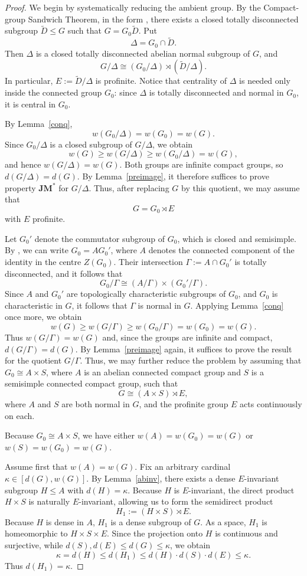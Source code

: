 \documentclass[12pt]{amsart}
\theoremstyle{definition}
\numberwithin{equation}{section}
\theoremstyle{remark}
\def\JM{\mathbf{JM}}
\begin{document}
\begin{proof}
We begin by systematically reducing the ambient group. By the Compact-group Sandwich Theorem, in the form \cite[Corollary~9.42]{HM}, there exists a closed totally disconnected subgroup $\widetilde D\leq G$ such that $G=G_0\widetilde D$. Put
\[
\Delta=G_0\cap\widetilde D.
\]
Then $\Delta$ is a closed totally disconnected abelian normal subgroup of $G$, and
\[
G/\Delta\cong (G_0/\Delta)\rtimes (\widetilde D/\Delta).
\]
In particular, $E:=\widetilde D/\Delta$ is profinite. Notice that centrality of $\Delta$ is needed only inside the connected group $G_0$: since $\Delta$ is totally disconnected and normal in $G_0$, it is central in $G_0$.

By Lemma~\ref{conq},
\[
w(G_0/\Delta)=w(G_0)=w(G).
\]
Since $G_0/\Delta$ is a closed subgroup of $G/\Delta$, we obtain
\[
w(G)\geq w(G/\Delta)\geq w(G_0/\Delta)=w(G),
\]
and hence $w(G/\Delta)=w(G)$. Both groups are infinite compact groups, so $d(G/\Delta)=d(G)$. By Lemma~\ref{preimage}, it therefore suffices to prove property $\JM^*$ for $G/\Delta$. Thus, after replacing $G$ by this quotient, we may assume that
\[
G=G_0\rtimes E
\]
with $E$ profinite.

Let $G_0'$ denote the commutator subgroup of $G_0$, which is closed and semisimple. 
By \cite[Theorem~9.24]{HM}, we can write $G_0 = A G_0'$, where $A$ denotes the connected component of the identity in the centre $Z(G_0)$. Their intersection $\Gamma := A \cap G_0'$ is totally disconnected, and it follows that
\[
G_0/\Gamma \cong (A/\Gamma) \times (G_0'/\Gamma).
\]
Since $A$ and $G_0'$ are topologically characteristic subgroups of $G_0$, and $G_0$ is characteristic in $G$, it follows that $\Gamma$ is normal in $G$. Applying Lemma~\ref{conq} once more, we obtain
\[
w(G)\geq w(G/\Gamma)\geq w(G_0/\Gamma)=w(G_0)=w(G).
\]
Thus $w(G/\Gamma)=w(G)$ and, since the groups are infinite and compact, $d(G/\Gamma)=d(G)$. By Lemma~\ref{preimage} again, it suffices to prove the result for the quotient $G/\Gamma$. 
Thus, we may further reduce the problem by assuming that $G_0 \cong A \times S$, where $A$ is an abelian connected compact group and $S$ is a semisimple connected compact group, such that
\[
G \cong (A \times S) \rtimes E,
\]
where $A$ and $S$ are both normal in $G$, and the profinite group $E$ acts continuously on each.

Because $G_0 \cong A \times S$, we have either $w(A) = w(G_0) = w(G)$ or $w(S) = w(G_0) = w(G)$. 

Assume first that $w(A) = w(G)$. 
Fix an arbitrary cardinal $\kappa \in [d(G), w(G)]$. 
By Lemma~\ref{abinv}, there exists a dense $E$-invariant subgroup $H \leq A$ with $d(H) = \kappa$. 
Because $H$ is $E$-invariant, the direct product $H \times S$ is naturally $E$-invariant, allowing us to form the semidirect product
\[
H_1 := (H \times S) \rtimes E.
\]
Because $H$ is dense in $A$, $H_1$ is a dense subgroup of $G$. As a space, $H_1$ is homeomorphic to $H\times S\times E$. Since the projection onto $H$ is continuous and surjective, while $d(S),d(E)\leq d(G)\leq\kappa$, we obtain
\[
\kappa=d(H)\leq d(H_1)\leq d(H)\cdot d(S)\cdot d(E)\leq\kappa.
\]
Thus $d(H_1)=\kappa$.


\end{proof}
\end{document}
